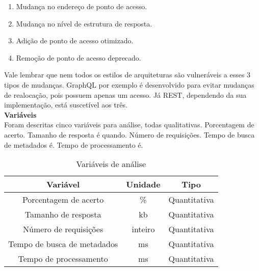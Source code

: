 \begin{enumerate}
\item Mudança no endereço de ponto de acesso.
\item Mudança no nível de estrutura de resposta.
\item Adição de ponto de acesso otimizado.
\item Remoção de ponto de acesso deprecado.
\end{enumerate}

Vale lembrar que nem todos os estilos de arquiteturas são vulneráveis a esses 3 tipos de mudanças. GraphQL por exemplo é desenvolvido para evitar mudanças de realocação, pois possuem apenas um acesso. Já REST, dependendo da sua implementação, está suscetível aos três. \\

\textbf{Variáveis} \\

Foram descritas cinco variáveis para análise, todas qualitativas.  Porcentagem de acerto. Tamanho de resposta é quando. Número de requisições. Tempo de busca de metadados é. Tempo de processamento é.

\begin{table}[H]
  \centering
  \begin{tabular}{|c|c|c|}
    \hline
    Variável & Unidade & Tipo \\
    \hline
    Porcentagem de acerto & \% & Quantitativa \\
    \hline
    Tamanho de resposta & kb & Quantitativa \\
    \hline
    Número de requisições & inteiro & Quantitativa \\
    \hline
    Tempo de busca de metadados & ms & Quantitativa \\
    \hline
    Tempo de processamento & ms & Quantitativa \\
    \hline
  \end{tabular}
  \caption{Variáveis de análise}
\end{table}

 
 
 
 
 
 

 
